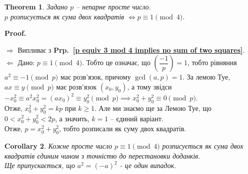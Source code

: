 \documentclass[a4paper, 14pt]{extarticle}
\makeatletter
\theoremstyle{theoremdd}
\newtheorem{theorem}{Theorem}[subsection]
\theoremstyle{theoremdd}
\theoremstyle{theoremdd}
\theoremstyle{theoremdd}
\theoremstyle{theoremdd}
\theoremstyle{theoremdd}
\theoremstyle{theoremdd}
\theoremstyle{theoremdd}
\newtheorem{corollary}[theorem]{Corollary}
\def\qed{$\blacksquare$}
\def\rightproof{$\boxed{\Rightarrow}$ }
\def\leftproof{$\boxed{\Leftarrow}$ }
\renewenvironment{proof}[1][Proof.\\]{\par
\pushQED{\hfill \qed}%
\normalfont \topsep6\p@\@plus6\p@\relax
\trivlist
\item\relax
{\bfseries
#1\@addpunct{.}}\hspace\labelsep\ignorespaces
}{%
\popQED\endtrivlist\@endpefalse
}
\newcommand\prpref[1]{\textbf{Prp.~\ref{#1}}}
\makeatother
\begin{document}
\begin{theorem}
Задано $p$ -- непарне просте число.\\
$p$ розписується як сума двох квадратів $\iff p \equiv 1 \pmod 4$.
\end{theorem}

\begin{proof}
\rightproof Випливає з \prpref{p equiv 3 mod 4 implies no sum of two squares}.
\bigskip \\
\leftproof Дано: $p \equiv 1 \pmod 4$. Тобто це означає, що $\left( \dfrac{-1}{p} \right) = 1$, тобто рівняння $a^2 \equiv -1 \pmod p$ має розв'язок, причому $\gcd(a,p) = 1$. За лемою Туе, $ax \equiv y \pmod p$ має розв'язок $(x_0,y_0)$, а тому звідси\\
$-x_0^2 \equiv a^2x_0^2 = (ax_0)^2 \equiv y_0^2 \pmod p \implies x_0^2 + y_0^2 \equiv 0 \pmod p$.\\
Отже, $x_0^2 + y_0^2 = kp$ при $k \geq 1$. Але ми знаємо ще за Лемою Туе, що $0 < x_0^2+y_0^2 < 2p$, а значить, $k = 1$ -- єдиний варіант.\\
Отже, $p = x_0^2+y_0^2$, тобто розписали як суму двох квадратів.
\end{proof}

\begin{corollary}
Кожне просте число $p \equiv 1 \pmod 4$ розписується як сума двох квадратів єдиним чином з точністю до перестановки доданків.\\
Ще припускається, що $a^2 = (-a)^2$ - це один випадок.
\end{corollary}
\end{document}
